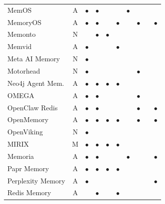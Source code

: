 \begin{table}[!t]
\begin{tabular}{@{}lc cccccccc@{}}
MemOS                & A & $\bullet$ & $\bullet$ &           &           & $\bullet$ &           &           &           \\
MemoryOS             & A & $\bullet$ & $\bullet$ &           & $\bullet$ &           & $\bullet$ &           & $\bullet$ \\
Memonto              & N &           & $\bullet$ & $\bullet$ &           &           &           &           &           \\
Memvid               & A & $\bullet$ &           &           & $\bullet$ &           &           &           &           \\
Meta AI Memory       & N & $\bullet$ &           &           &           &           &           &           &           \\
Motorhead            & N & $\bullet$ &           &           &           &           & $\bullet$ &           &           \\
Neo4j Agent Mem.     & A & $\bullet$ & $\bullet$ & $\bullet$ & $\bullet$ &           &           &           &           \\
OMEGA                & A & $\bullet$ & $\bullet$ &           &           &           & $\bullet$ &           &           \\
OpenClaw Redis       & A & $\bullet$ & $\bullet$ &           &           &           & $\bullet$ &           & $\bullet$ \\
OpenMemory           & A & $\bullet$ & $\bullet$ & $\bullet$ & $\bullet$ &           & $\bullet$ &           & $\bullet$ \\
OpenViking           & N & $\bullet$ &           &           &           &           &           &           &           \\
MIRIX                & M & $\bullet$ & $\bullet$ & $\bullet$ & $\bullet$ &           &           &           &           \\
Memoria              & A & $\bullet$ & $\bullet$ &           &           & $\bullet$ &           &           & $\bullet$ \\
Papr Memory          & A & $\bullet$ & $\bullet$ & $\bullet$ & $\bullet$ &           &           &           &           \\
Perplexity Memory    & A & $\bullet$ &           &           &           &           &           &           & $\bullet$ \\
Redis Memory         & A &           & $\bullet$ &           & $\bullet$ &           &           &           &           \\

\end{tabular}
\end{table}
